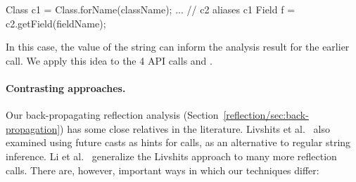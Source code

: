 \begin{javacodelinum}
Class c1 = Class.forName(className);
...      // c2 aliases c1
Field f = c2.getField(fieldName); 
\end{javacodelinum}

In this case, the value of the  string can inform the
analysis result for the earlier  call. We apply this
idea to the 4 API calls  and
.

\paragraph{Contrasting approaches.}

Our back-propagating reflection analysis
(Section~\ref{reflection/sec:back-propagation}) has some close
relatives in the literature.  Livshits et
al.~\cite{aplas/LivshitsWL05,livshits:thesis} also examined using
future casts as hints for  calls, as an alternative to
regular string inference. Li et al.~\cite{ecoop/LiTSX14} generalize
the Livshits approach to many more reflection calls. There are,
however, important ways in which our techniques differ:

